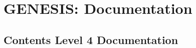 \documentclass[12pt]{article}
\begin{document}
\section*{GENESIS: Documentation}

\subsection*{Contents Level 4 Documentation}

\end{document}
